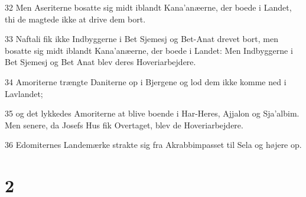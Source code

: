 \par 32 Men Aseriterne bosatte sig midt iblandt Kana'anæerne, der boede i Landet, thi de magtede ikke at drive dem bort.
\par 33 Naftali fik ikke Indbyggerne i Bet Sjemesj og Bet-Anat drevet bort, men bosatte sig midt iblandt Kana'anæerne, der boede i Landet: Men Indbyggerne i Bet Sjemesj og Bet Anat blev deres Hoveriarbejdere.
\par 34 Amoriterne trængte Daniterne op i Bjergene og lod dem ikke komme ned i Lavlandet;
\par 35 og det lykkedes Amoriterne at blive boende i Har-Heres, Ajjalon og Sja'albim. Men senere, da Josefs Hus fik Overtaget, blev de Hoveriarbejdere.
\par 36 Edomiternes Landemærke strakte sig fra Akrabbimpasset til Sela og højere op.

\chapter{2}

